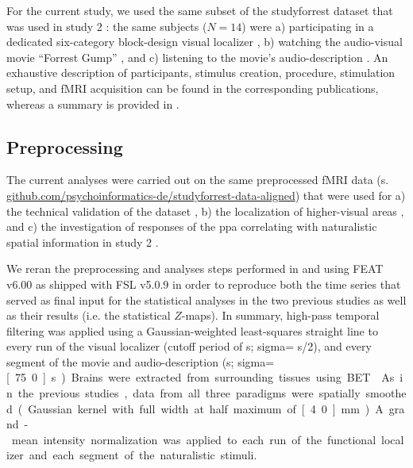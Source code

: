 
For the current study, we used the same subset of the studyforrest dataset that
was used in study 2 \citep{haeusler2022processing}:
%
the same subjects ($N=14$) were
a) participating in a dedicated six-category block-design visual localizer
\citep{sengupta2016extension},
b) watching the audio-visual movie ``Forrest Gump''
\citep{hanke2016simultaneous}, and
c) listening to the movie's audio-description \citep{hanke2014audiomovie}.
An exhaustive description of participants, stimulus creation, procedure,
stimulation setup, and fMRI acquisition can be found in the corresponding
publications, whereas a summary is provided in \citet{haeusler2022processing}.



\subsection{Preprocessing}

The current analyses were carried out on the same preprocessed fMRI data (s.
\href{https://github.com/psychoinformatics-de/studyforrest-data-aligned
}{\url{github.com/psychoinformatics-de/studyforrest-data-aligned}}) that were
used for
%
a) the technical validation of the dataset \citep{hanke2016simultaneous},
%
b) the localization of higher-visual areas \citep{sengupta2016extension}, and
%
c) the investigation of responses of the \ac{ppa} correlating with naturalistic
spatial information in study 2 \citep{haeusler2022processing}.

%
We reran the preprocessing and analyses steps performed in
\citet{sengupta2016extension} and \citet{haeusler2022processing} using FEAT
v6.00 \citep[FMRI Expert Analysis Tool;][]{woolrich2001autocorr} as shipped with
FSL v5.0.9 \citep[\href{https://www.fmrib.ox.ac.uk/fsl}{FMRIB's Software
Library;}][]{smith2004fsl} in order to reproduce both the time series that
served as final input for the statistical analyses in the two previous studies
as well as their results (i.e. the statistical $Z$-maps).
In summary, high-pass temporal filtering was applied using a Gaussian-weighted
least-squares straight line to every run of the visual localizer (cutoff period
of \unit[100]{s}; sigma= \unit[100]{s}/2), and every segment of the
movie and audio-description (\unit[150]{s}; sigma=\unit[75.0]{s}).
Brains were extracted from surrounding tissues using BET \citep{smith2002bet}.
As in the previous studies, data from all three paradigms were spatially
smoothed (Gaussian kernel with full width at half maximum of \unit[4.0]{mm}).
A grand-mean intensity normalization was applied to each run of the functional
localizer and each segment of the naturalistic stimuli.


